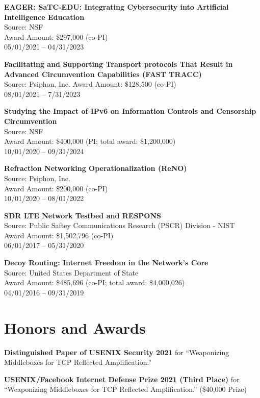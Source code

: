 \documentclass[margin,11pt]{res} %
\begin{document}
\textbf{EAGER: SaTC-EDU: Integrating Cybersecurity into Artificial Intelligence Education} \\
Source: NSF \\
Award Amount: \$297,000 (co-PI) \\
05/01/2021 -- 04/31/2023


\textbf{Facilitating and Supporting Transport protocols That Result in Advanced Circumvention Capabilities (FAST TRACC)} \\
Source: Psiphon, Inc.
Award Amount: \$128,500 (co-PI) \\
08/01/2021 -- 7/31/2023

\textbf{Studying the Impact of IPv6 on Information Controls and Censorship Circumvention} \\
Source: NSF \\
Award Amount: \$400,000 (PI; total award: \$1,200,000) \\
10/01/2020 -- 09/31/2024

\textbf{Refraction Networking Operationalization (ReNO)} \\
Source: Psiphon, Inc. \\
Award Amount: \$200,000 (co-PI) \\
10/01/2020 -- 08/01/2022

\textbf{SDR LTE Network Testbed and RESPONS} \\
Source: Public Saftey Communications Research (PSCR) Division - NIST \\
Award Amount: \$1,502,796 (co-PI) \\
06/01/2017 -- 05/31/2020

\textbf{Decoy Routing: Internet Freedom in the Network's Core} \\
Source: United States Department of State \\
Award Amount: \$485,696 (co-PI; total award: \$4,000,026) \\
04/01/2016 -- 09/31/2019



\vspace{6pt}
\section{\large Honors and Awards}

    \textbf{Distinguished Paper of USENIX Security 2021}
    for ``Weaponizing Middleboxes for TCP Reflected Amplification.''

    \textbf{USENIX/Facebook Internet Defense Prize 2021 (Third Place)}
    for ``Weaponizing Middleboxes for TCP Reflected Amplification.'' (\$40,000 Prize)
\end{document}
